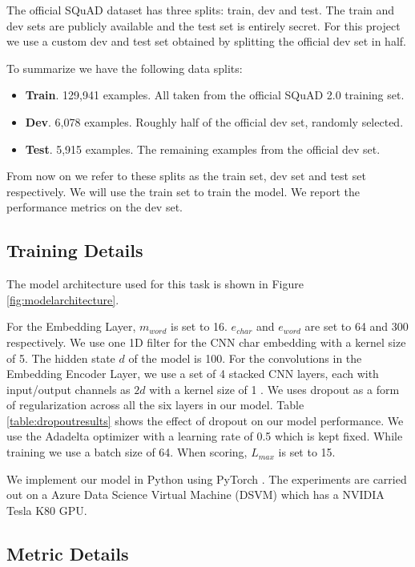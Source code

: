 The official SQuAD dataset has three splits: train, dev and test. The train and dev sets are publicly available and the test set is entirely secret. For this project we use a custom dev and test set obtained by splitting the official dev set in half. 

To summarize we have the following data splits:

\begin{itemize}
\item \textbf{Train}. 129,941 examples. All taken from the official SQuAD 2.0 training set.
\item \textbf{Dev}. 6,078 examples. Roughly half of the official dev set, randomly selected.
\item \textbf{Test}. 5,915 examples. The remaining examples from the official dev set.
\end{itemize}

From now on we refer to these splits as the train set, dev set and test set respectively. We will use the train set to train the model. We report the performance metrics on the dev set.

\subsection{Training Details}
\label{subsec:trainingdetails}

The model architecture used for this task is shown in Figure \ref{fig:modelarchitecture}. 

For the Embedding Layer, $m_{word}$ is set to 16. ${e_{char}}$ and ${e_{word}}$ are set to 64 and 300 respectively. We use one 1D filter for the CNN char embedding with a kernel size of 5. The hidden state $d$ of the model is 100. For the convolutions in the Embedding Encoder Layer, we use a set of 4 stacked CNN layers, each with input/output channels as $2d$ with a kernel size of 1 . We uses dropout as a form of regularization across all the six layers in our model. Table \ref{table:dropoutresults} shows the effect of dropout on our model performance. We use the Adadelta optimizer \cite{zeiler2012adadelta} with a learning rate of 0.5 which is kept fixed. While training we use a batch size of 64. When scoring, $L_{max}$ is set to 15.

We implement our model in Python using PyTorch \cite{pytorch}. The experiments are carried out on a Azure Data Science Virtual Machine (DSVM) \cite{dsvm} which has a NVIDIA Tesla K80 GPU.

\subsection{Metric Details}
\label{subsec:metricdetails}


